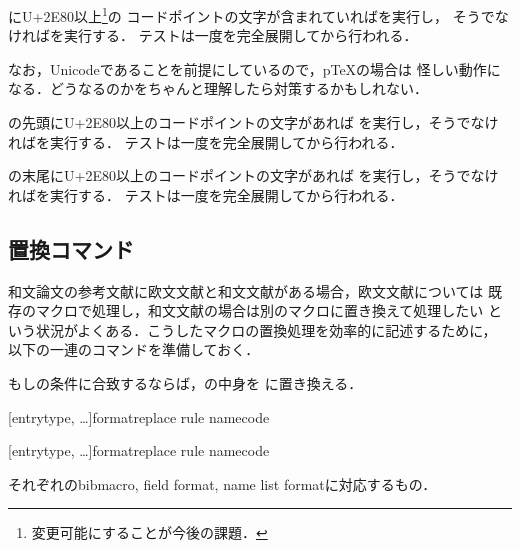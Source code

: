 \documentclass{jlreq}
\begin{document}
\begin{ltxsyntax}

  にU+2E80以上\footnote{変更可能にすることが今後の課題．}の
  コードポイントの文字が含まれていればを実行し，
  そうでなければを実行する．
  テストは一度を完全展開してから行われる．

  なお，Unicodeであることを前提にしているので，p\TeX の場合は
  怪しい動作になる．どうなるのかをちゃんと理解したら対策するかもしれない．


  の先頭にU+2E80以上のコードポイントの文字があれば
  を実行し，そうでなければを実行する．
  テストは一度を完全展開してから行われる．


  の末尾にU+2E80以上のコードポイントの文字があれば
  を実行し，そうでなければを実行する．
  テストは一度を完全展開してから行われる．
\end{ltxsyntax}

\subsection{置換コマンド}

和文論文の参考文献に欧文文献と和文文献がある場合，欧文文献については
既存のマクロで処理し，和文文献の場合は別のマクロに置き換えて処理したい
という状況がよくある．こうしたマクロの置換処理を効率的に記述するために，
以下の一連のコマンドを準備しておく．

\begin{ltxsyntax}

  もしの条件に合致するならば，の中身を
  に置き換える．


  [entrytype, \dots]{format}{replace rule name}{code}

  [entrytype, \dots]{format}{replace rule name}{code}

  それぞれのbibmacro, field format, name list formatに対応するもの．
\end{ltxsyntax}
\end{document}
